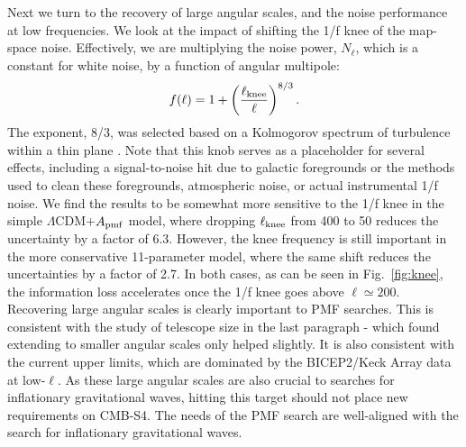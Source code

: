 \documentclass[apj]{emulateapj}
\newcommand{\apmf}{\ensuremath{A_{\rm pmf}}}
\newcommand{\lcdm}{\ensuremath{\Lambda}CDM}
\newcommand{\lknee}{\ensuremath{\ell_{\rm knee}}}
\newcommand{\be}{\begin{equation}}
\newcommand{\ee}{\end{equation}}
\begin{document}
Next we turn to the recovery of large angular scales, and the noise performance at low frequencies. 
We look at the impact of shifting the 1/f knee of the map-space noise. 
Effectively, we are multiplying the noise power, $N_\ell$, which is a constant for white noise,  by a function of angular multipole:
\be \label{eqn:knee}
f(\ell) = 1 + \left(\frac{\ell_{\rm knee}}{\ell}\right)^{8/3}.
\ee 
The exponent, 8/3, was selected based on a Kolmogorov spectrum of turbulence within a thin plane \citep{lay00}. %
Note that this knob  serves as a placeholder for several effects, including a signal-to-noise hit due to galactic foregrounds or the methods used to clean these foregrounds, atmospheric noise, or actual instrumental 1/f noise. 
We find the results to be somewhat more sensitive to the 1/f knee in the simple \lcdm{}+\apmf{} model, where dropping \lknee{} from 400 to 50 reduces the uncertainty by a factor of 6.3.
However, the knee frequency is still important in the more conservative 11-parameter model, where the same shift reduces the uncertainties by a factor of 2.7. 
In both cases, as can be seen in Fig.~\ref{fig:knee}, the information loss accelerates once the 1/f knee goes above $\ell \simeq 200$. 
Recovering large angular scales is clearly important to PMF searches. 
This is consistent with the study of telescope size in the last paragraph - which found extending to smaller angular scales only helped slightly. 
It is also consistent with the current upper limits, which are dominated by the BICEP2/Keck Array data at low-$\ell$. 
As  these large angular scales are also crucial to searches for inflationary gravitational waves, hitting this target should not place new requirements on CMB-S4. 
The needs of the PMF search are well-aligned with the search for inflationary gravitational waves.
\end{document}
